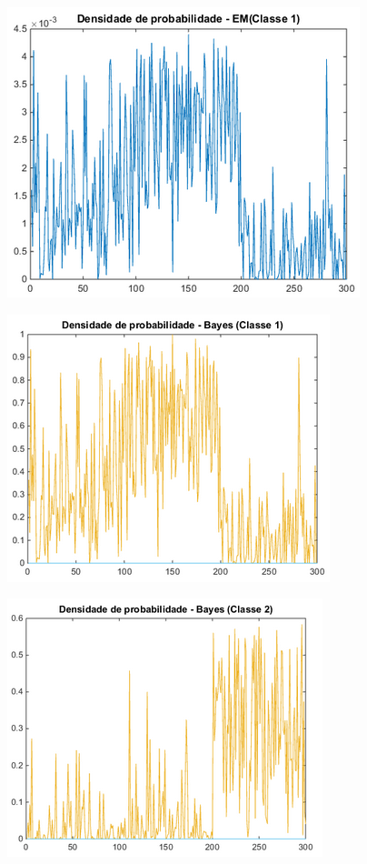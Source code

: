 \documentclass[12pt,twoside]{report}
\begin{document}
\begin{figure}[ht]
    \centering
    \includegraphics{pdf_em_c1}
    \caption{}
    \label{fig:pdf_em_c1}
\end{figure}

\begin{figure}[ht]
    \centering
    \includegraphics{bayes_c1}
    \caption{}
    \label{fig:bayes_c1}
\end{figure}

\begin{figure}[ht]
    \centering
    \includegraphics{bayes_c2}
    \caption{}
    \label{fig:bayes_c2}
\end{figure}
\end{document}
